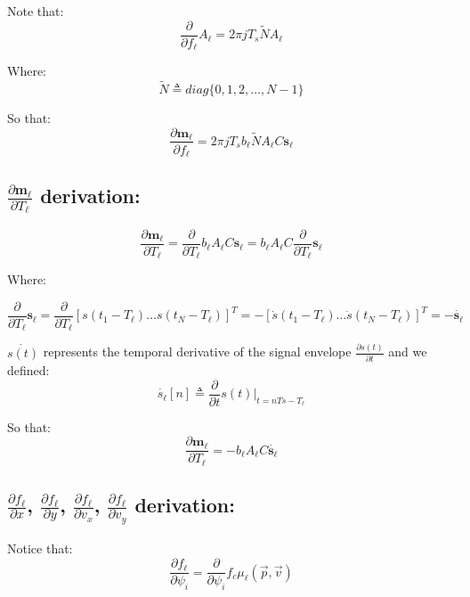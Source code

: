 Note that:
\begin{equation}
\frac{\partial}{\partial f_\ell}A_\ell = 2 \pi j T_s \tilde{N} A_\ell
\end{equation}

Where:
\begin{equation}
\tilde{N} \triangleq diag\{0,1,2,\dots,N-1\}
\end{equation}

So that:
\begin{equation}
\frac{\partial \mathbf{m_\ell}}{\partial f_\ell}=2 \pi j T_s b_\ell \tilde{N} A_\ell C \mathbf{s_\ell}
\end{equation}

\subsection{$\frac{\partial \mathbf{m_\ell}}{\partial T_\ell}$ derivation:}
\begin{equation}
\frac{\partial \mathbf{m_\ell}}{\partial T_\ell} =\frac{\partial}{\partial T_\ell} b_\ell  A_\ell C \mathbf{s_\ell}=b_\ell  A_\ell C \frac{\partial}{\partial T_\ell}\mathbf{s_\ell}
\end{equation}

Where:

\begin{equation}
\frac{\partial}{\partial T_\ell} \mathbf{s_\ell} = \frac{\partial}{\partial T_\ell} [s(t_1-T_\ell) \dots s(t_N-T_\ell)]^T=-[\dot{s}(t_1-T_\ell )\dots \dot{s}(t_N-T_\ell)]^T = -\mathbf{\dot{s_\ell}}
\end{equation}

$\dot{s(t)}$ represents the temporal derivative of the signal envelope $\frac{\partial s(t)}{\partial t}$ and we defined:
\begin{equation}
\dot{s_\ell}[n] \triangleq \frac{\partial}{\partial t} s(t)|_{t=nTs-T_\ell}
\end{equation}

So that:
\begin{equation}
\frac{\partial \mathbf{m_\ell}}{\partial T_\ell} = -b_\ell A_\ell C \mathbf{\dot{s_\ell}}
\end{equation}

\subsection{$\frac{\partial f_\ell}{\partial x}$, $\frac{\partial f_\ell}{\partial y}$,
$\frac{\partial f_\ell}{\partial v_x}$, $\frac{\partial f_\ell}{\partial v_y}$
 derivation:}
 Notice that:
\begin{equation}
\frac{\partial f_\ell}{\partial \psi_i} = \frac{\partial}{\partial \psi_i} f_c {\mu}_\ell (\vec{p},\vec{v})
\end{equation}

